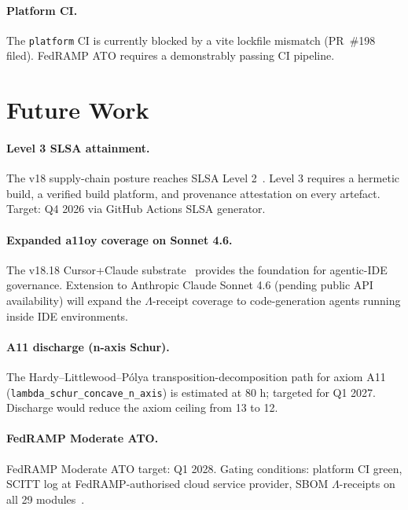 \documentclass[11pt,letterpaper]{article}
\theoremstyle{definition}
\theoremstyle{remark}
\begin{document}
\paragraph{Platform CI.}
The \texttt{platform} CI is currently blocked by a vite lockfile
mismatch (PR~\#198 filed).
FedRAMP ATO requires a demonstrably passing CI pipeline.

\section{Future Work}
\label{sec:futurework}

\paragraph{Level 3 SLSA attainment.}
The v18 supply-chain posture reaches SLSA Level 2~\cite{SLSA2023}.
Level 3 requires a hermetic build, a verified build platform, and
provenance attestation on every artefact.
Target: Q4 2026 via GitHub Actions SLSA generator.

\paragraph{Expanded a11oy coverage on Sonnet 4.6.}
The v18.18 Cursor+Claude substrate~\cite{Anthropic2024MCP} provides the
foundation for agentic-IDE governance.
Extension to Anthropic Claude Sonnet 4.6 (pending public API
availability) will expand the \(\Lambda\)-receipt coverage to
code-generation agents running inside IDE environments.

\paragraph{A11 discharge (n-axis Schur).}
The Hardy--Littlewood--P{\'o}lya transposition-decomposition path for
axiom A11 (\texttt{lambda\_schur\_concave\_n\_axis}) is estimated at
80 h; targeted for Q1 2027.
Discharge would reduce the axiom ceiling from 13 to 12.

\paragraph{FedRAMP Moderate ATO.}
FedRAMP Moderate ATO target: Q1 2028.
Gating conditions: platform CI green, SCITT log at FedRAMP-authorised
cloud service provider, SBOM \(\Lambda\)-receipts on all 29
modules~\cite{FedRAMP2023}.
\end{document}
